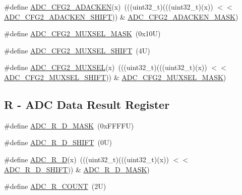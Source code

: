 \begin{DoxyCompactItemize}
\item 
\#define \mbox{\hyperlink{group___a_d_c___register___masks_ga50dca8b1fee08be88a54965c18aa3f34}{A\+D\+C\+\_\+\+C\+F\+G2\+\_\+\+A\+D\+A\+C\+K\+EN}}(x)~(((uint32\+\_\+t)(((uint32\+\_\+t)(x)) $<$$<$ \mbox{\hyperlink{group___a_d_c___register___masks_gad009e6fe93b9f44fb0f79cd479d8bb1a}{A\+D\+C\+\_\+\+C\+F\+G2\+\_\+\+A\+D\+A\+C\+K\+E\+N\+\_\+\+S\+H\+I\+FT}})) \& \mbox{\hyperlink{group___a_d_c___register___masks_ga1158034a83b78e238c3f8ca481ab9b27}{A\+D\+C\+\_\+\+C\+F\+G2\+\_\+\+A\+D\+A\+C\+K\+E\+N\+\_\+\+M\+A\+SK}})
\item 
\#define \mbox{\hyperlink{group___a_d_c___register___masks_ga5c50199c9b27cb92554a647909c6338a}{A\+D\+C\+\_\+\+C\+F\+G2\+\_\+\+M\+U\+X\+S\+E\+L\+\_\+\+M\+A\+SK}}~(0x10\+U)
\item 
\#define \mbox{\hyperlink{group___a_d_c___register___masks_ga3d74b5bda99558af8b4f0e986ef7ea9b}{A\+D\+C\+\_\+\+C\+F\+G2\+\_\+\+M\+U\+X\+S\+E\+L\+\_\+\+S\+H\+I\+FT}}~(4\+U)
\item 
\#define \mbox{\hyperlink{group___a_d_c___register___masks_ga6aeafd3ea1d2b27884cf4d6b15818398}{A\+D\+C\+\_\+\+C\+F\+G2\+\_\+\+M\+U\+X\+S\+EL}}(x)~(((uint32\+\_\+t)(((uint32\+\_\+t)(x)) $<$$<$ \mbox{\hyperlink{group___a_d_c___register___masks_ga3d74b5bda99558af8b4f0e986ef7ea9b}{A\+D\+C\+\_\+\+C\+F\+G2\+\_\+\+M\+U\+X\+S\+E\+L\+\_\+\+S\+H\+I\+FT}})) \& \mbox{\hyperlink{group___a_d_c___register___masks_ga5c50199c9b27cb92554a647909c6338a}{A\+D\+C\+\_\+\+C\+F\+G2\+\_\+\+M\+U\+X\+S\+E\+L\+\_\+\+M\+A\+SK}})
\end{DoxyCompactItemize}
\subsection*{R -\/ A\+DC Data Result Register}
\begin{DoxyCompactItemize}
\item 
\#define \mbox{\hyperlink{group___a_d_c___register___masks_ga7dadc81f58826b303fb83918820cd177}{A\+D\+C\+\_\+\+R\+\_\+\+D\+\_\+\+M\+A\+SK}}~(0x\+F\+F\+F\+F\+U)
\item 
\#define \mbox{\hyperlink{group___a_d_c___register___masks_ga8e2365e522772584a5ee2dd6a8b0987a}{A\+D\+C\+\_\+\+R\+\_\+\+D\+\_\+\+S\+H\+I\+FT}}~(0\+U)
\item 
\#define \mbox{\hyperlink{group___a_d_c___register___masks_ga170d774b5b873c5b8355cd8a57810f32}{A\+D\+C\+\_\+\+R\+\_\+D}}(x)~(((uint32\+\_\+t)(((uint32\+\_\+t)(x)) $<$$<$ \mbox{\hyperlink{group___a_d_c___register___masks_ga8e2365e522772584a5ee2dd6a8b0987a}{A\+D\+C\+\_\+\+R\+\_\+\+D\+\_\+\+S\+H\+I\+FT}})) \& \mbox{\hyperlink{group___a_d_c___register___masks_ga7dadc81f58826b303fb83918820cd177}{A\+D\+C\+\_\+\+R\+\_\+\+D\+\_\+\+M\+A\+SK}})
\item 
\#define \mbox{\hyperlink{group___a_d_c___register___masks_ga2017fd646769acfc9ad3fab489690612}{A\+D\+C\+\_\+\+R\+\_\+\+C\+O\+U\+NT}}~(2\+U)
\end{DoxyCompactItemize}
